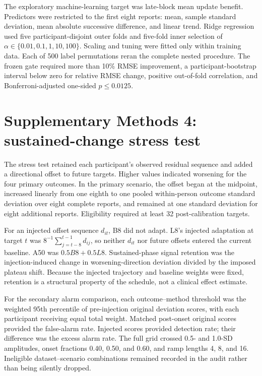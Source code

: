 \documentclass[pdflatex,sn-vancouver-num]{sn-jnl}
\begin{document}
The exploratory machine-learning target was late-block mean update benefit. Predictors were restricted to the first eight reports: mean, sample standard deviation, mean absolute successive difference, and linear trend. Ridge regression used five participant-disjoint outer folds and five-fold inner selection of $\alpha\in\{0.01,0.1,1,10,100\}$. Scaling and tuning were fitted only within training data. Each of 500 label permutations reran the complete nested procedure. The frozen gate required more than 10\% RMSE improvement, a participant-bootstrap interval below zero for relative RMSE change, positive out-of-fold correlation, and Bonferroni-adjusted one-sided $p\leq0.0125$.

\section{Supplementary Methods 4: sustained-change stress test}

The stress test retained each participant's observed residual sequence and added a directional offset to future targets. Higher values indicated worsening for the four primary outcomes. In the primary scenario, the offset began at the midpoint, increased linearly from one eighth to one pooled within-person outcome standard deviation over eight complete reports, and remained at one standard deviation for eight additional reports. Eligibility required at least 32 post-calibration targets.

For an injected offset sequence $d_{it}$, B8 did not adapt. L8's injected adaptation at target $t$ was $8^{-1}\sum_{j=t-8}^{t-1}d_{ij}$, so neither $d_{it}$ nor future offsets entered the current baseline. A50 was $0.5B8+0.5L8$. Sustained-phase signal retention was the injection-induced change in worsening-direction deviation divided by the imposed plateau shift. Because the injected trajectory and baseline weights were fixed, retention is a structural property of the schedule, not a clinical effect estimate.

For the secondary alarm comparison, each outcome--method threshold was the weighted 95th percentile of pre-injection original deviation scores, with each participant receiving equal total weight. Matched post-onset original scores provided the false-alarm rate. Injected scores provided detection rate; their difference was the excess alarm rate. The full grid crossed 0.5- and 1.0-SD amplitudes, onset fractions 0.40, 0.50, and 0.60, and ramp lengths 4, 8, and 16. Ineligible dataset--scenario combinations remained recorded in the audit rather than being silently dropped.
\end{document}
